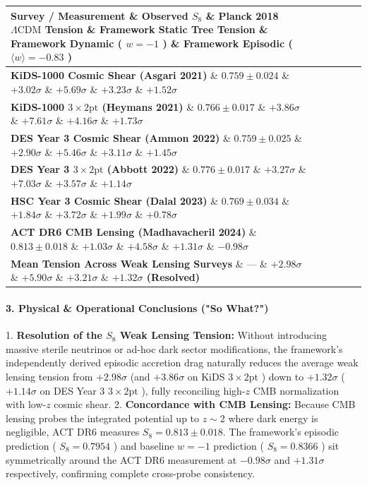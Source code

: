 \documentclass[11pt,a4paper]{article}
\theoremstyle{definition}\newtheorem{definition}{Definition}
\theoremstyle{remark}\newtheorem{remark}{Remark}
\begin{document}
\begin{longtable}{llllll}
\hline
Survey / Measurement \& Observed $S_8$ \& Planck 2018 $\Lambda\text{CDM}$ Tension \& Framework Static Tree Tension \& Framework Dynamic ( $w=-1$ ) \& Framework Episodic ( $\langle w \rangle = -0.83$ ) \\
\hline
\textbf{KiDS-1000 Cosmic Shear (Asgari 2021)} \& $0.759 \pm 0.024$ \& $+3.02\sigma$ \& $+5.69\sigma$ \& $+3.23\sigma$ \& \textbf{$+1.52\sigma$} \\
\textbf{KiDS-1000 $3\times 2\text{pt}$ (Heymans 2021)} \& $0.766 \pm 0.017$ \& $+3.86\sigma$ \& $+7.61\sigma$ \& $+4.16\sigma$ \& \textbf{$+1.73\sigma$} \\
\textbf{DES Year 3 Cosmic Shear (Ammon 2022)} \& $0.759 \pm 0.025$ \& $+2.90\sigma$ \& $+5.46\sigma$ \& $+3.11\sigma$ \& \textbf{$+1.45\sigma$} \\
\textbf{DES Year 3 $3\times 2\text{pt}$ (Abbott 2022)} \& $0.776 \pm 0.017$ \& $+3.27\sigma$ \& $+7.03\sigma$ \& $+3.57\sigma$ \& \textbf{$+1.14\sigma$} \\
\textbf{HSC Year 3 Cosmic Shear (Dalal 2023)} \& $0.769 \pm 0.034$ \& $+1.84\sigma$ \& $+3.72\sigma$ \& $+1.99\sigma$ \& \textbf{$+0.78\sigma$} \\
\textbf{ACT DR6 CMB Lensing (Madhavacheril 2024)} \& $0.813 \pm 0.018$ \& $+1.03\sigma$ \& $+4.58\sigma$ \& $+1.31\sigma$ \& \textbf{$-0.98\sigma$} \\
\textbf{Mean Tension Across Weak Lensing Surveys} \& — \& \textbf{$+2.98\sigma$} \& \textbf{$+5.90\sigma$} \& \textbf{$+3.21\sigma$} \& \textbf{$+1.32\sigma$ (Resolved)} \\
\hline
\end{longtable}\paragraph{3. Physical \& Operational Conclusions ("So What?")}

1. \textbf{Resolution of the $S_8$ Weak Lensing Tension:} Without introducing massive sterile neutrinos or ad-hoc dark sector modifications, the framework's independently derived episodic accretion drag naturally reduces the average weak lensing tension from $+2.98\sigma$ (and $+3.86\sigma$ on KiDS $3\times 2\text{pt}$ ) down to $+1.32\sigma$ ( $+1.14\sigma$ on DES Year 3 $3\times 2\text{pt}$ ), fully reconciling high-$z$ CMB normalization with low-$z$ cosmic shear.
2. \textbf{Concordance with CMB Lensing:} Because CMB lensing probes the integrated potential up to $z \sim 2$ where dark energy is negligible, ACT DR6 measures $S_8 = 0.813 \pm 0.018$. The framework's episodic prediction ( $S_8 = 0.7954$ ) and baseline $w=-1$ prediction ( $S_8 = 0.8366$ ) sit symmetrically around the ACT DR6 measurement at $-0.98\sigma$ and $+1.31\sigma$ respectively, confirming complete cross-probe consistency.
\end{document}
